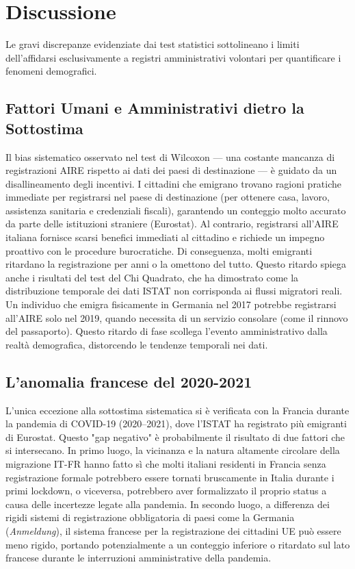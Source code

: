\section{Discussione}\label{sec:discussion}

Le gravi discrepanze evidenziate dai test statistici sottolineano i limiti dell'affidarsi esclusivamente a registri amministrativi volontari per quantificare i fenomeni demografici.
\subsection{Fattori Umani e Amministrativi dietro la Sottostima}
Il bias sistematico osservato nel test di Wilcoxon — una costante mancanza di registrazioni AIRE rispetto ai dati dei paesi di destinazione — è guidato da un disallineamento degli incentivi.
I cittadini che emigrano trovano ragioni pratiche immediate per registrarsi nel paese di destinazione (per ottenere casa, lavoro, assistenza sanitaria e credenziali fiscali), garantendo un conteggio molto accurato da parte delle istituzioni straniere (Eurostat).
Al contrario, registrarsi all'AIRE italiana fornisce scarsi benefici immediati al cittadino e richiede un impegno proattivo con le procedure burocratiche.
Di conseguenza, molti emigranti ritardano la registrazione per anni o la omettono del tutto.
Questo ritardo spiega anche i risultati del test del Chi Quadrato, che ha dimostrato come la distribuzione temporale dei dati ISTAT non corrisponda ai flussi migratori reali.
Un individuo che emigra fisicamente in Germania nel 2017 potrebbe registrarsi all'AIRE solo nel 2019, quando necessita di un servizio consolare (come il rinnovo del passaporto).
Questo ritardo di fase scollega l'evento amministrativo dalla realtà demografica, distorcendo le tendenze temporali nei dati.
\subsection{L'anomalia francese del 2020-2021}
L'unica eccezione alla sottostima sistematica si è verificata con la Francia durante la pandemia di COVID-19 (2020–2021), dove l'ISTAT ha registrato più emigranti di Eurostat.
Questo "gap negativo" è probabilmente il risultato di due fattori che si intersecano.
In primo luogo, la vicinanza e la natura altamente circolare della migrazione IT-FR hanno fatto sì che molti italiani residenti in Francia senza registrazione formale potrebbero essere tornati bruscamente in Italia durante i primi lockdown, o viceversa, potrebbero aver formalizzato il proprio status a causa delle incertezze legate alla pandemia.
In secondo luogo, a differenza dei rigidi sistemi di registrazione obbligatoria di paesi come la Germania (\textit{Anmeldung}), il sistema francese per la registrazione dei cittadini UE può essere meno rigido, portando potenzialmente a un conteggio inferiore o ritardato sul lato francese durante le interruzioni amministrative della pandemia.

